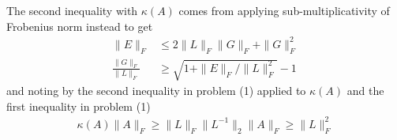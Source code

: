 \documentclass[12pt,letterpaper,boxed]{hmcpset}
\begin{document}
\begin{solution}
\begin{enumerate}
      The second inequality with $\kappa(A)$ comes from applying 
      sub-multiplicativity of Frobenius norm instead to get
      \begin{align}
	\|E\|_F &\leq 2 \|L\|_F \|G\|_F + \|G\|_F^2 \\
	\frac{\|G\|_F}{\|L\|_F} &\geq \sqrt{1 + \|E\|_F / \|L\|_F^2}  - 1
      \end{align}
      and noting by the second inequality in problem (1) applied to $\kappa(A)$
      and the first inequality in problem (1)
      \begin{align}
	\kappa(A) \|A\|_F 
	\geq \|L\|_F \|L^{-1}\|_2 \|A\|_F
	\geq \|L\|_F^2  
      \end{align}
  \end{enumerate}
\end{solution}

\begin{problem}
	
\end{problem}

\begin{solution}
	
\end{solution}
\end{document}
